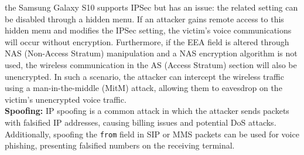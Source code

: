 \documentclass[english]{article}
\begin{document}
the Samsung Galaxy S10 supports IPSec but has an issue: the related setting can be
disabled through a hidden menu. If an attacker gains remote access to this hidden
menu and modifies the IPSec setting, the victim's voice communications will occur
without encryption. Furthermore, if the EEA field is altered through NAS
(Non-Access Stratum) manipulation and a NAS encryption algorithm is not used,
the wireless communication in the AS (Access Stratum) section will also be unencrypted.
In such a scenario, the attacker can intercept the wireless traffic using a
man-in-the-middle (MitM) attack, allowing them to eavesdrop on the victim's
unencrypted voice traffic.
\\[0.2cm]
\textbf{Spoofing:} IP spoofing is a common attack in which the attacker sends packets with
falsified IP addresses, causing billing issues and potential DoS attacks. Additionally,
spoofing the \texttt{from} field in SIP or MMS packets can be used for voice phishing,
presenting falsified numbers on the receiving terminal.
\end{document}
